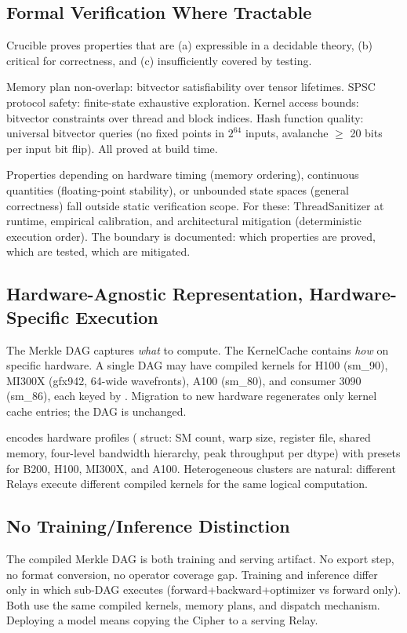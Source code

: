 \subsection{Formal Verification Where Tractable}

Crucible proves properties that are (a) expressible in a decidable theory, (b) critical for correctness, and (c) insufficiently covered by testing.

Memory plan non-overlap: bitvector satisfiability over tensor lifetimes.
SPSC protocol safety: finite-state exhaustive exploration.
Kernel access bounds: bitvector constraints over thread and block indices.
Hash function quality: universal bitvector queries (no fixed points in $2^{64}$ inputs, avalanche $\geq$ 20 bits per input bit flip).
All proved at build time.

Properties depending on hardware timing (memory ordering), continuous quantities (floating-point stability), or unbounded state spaces (general correctness) fall outside static verification scope.
For these: ThreadSanitizer at runtime, empirical calibration, and architectural mitigation (deterministic execution order).
The boundary is documented: which properties are proved, which are tested, which are mitigated.

\subsection{Hardware-Agnostic Representation, Hardware-Specific Execution}

The Merkle DAG captures \emph{what} to compute.
The KernelCache contains \emph{how} on specific hardware.
A single DAG may have compiled kernels for H100 (sm\_90), MI300X (gfx942, 64-wide wavefronts), A100 (sm\_80), and consumer 3090 (sm\_86), each keyed by .
Migration to new hardware regenerates only kernel cache entries; the DAG is unchanged.

 encodes hardware profiles ( struct: SM count, warp size, register file, shared memory, four-level bandwidth hierarchy, peak throughput per dtype) with presets for B200, H100, MI300X, and A100.
Heterogeneous clusters are natural: different Relays execute different compiled kernels for the same logical computation.

\subsection{No Training/Inference Distinction}

The compiled Merkle DAG is both training and serving artifact.
No export step, no format conversion, no operator coverage gap.
Training and inference differ only in which sub-DAG executes (forward+backward+optimizer vs forward only).
Both use the same compiled kernels, memory plans, and dispatch mechanism.
Deploying a model means copying the Cipher to a serving Relay.
